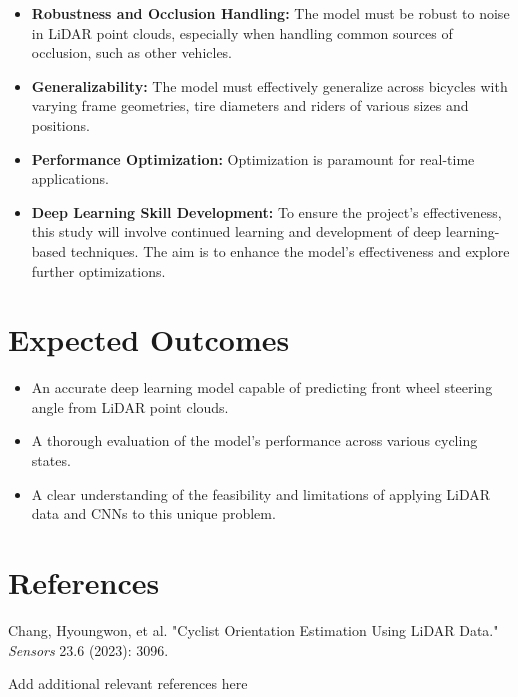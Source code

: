 \documentclass{article}
\begin{document}
\begin{itemize}
    \item \textbf{Robustness and Occlusion Handling:} The model must be robust to noise in LiDAR point clouds, especially when handling common sources of occlusion, such as other vehicles.
    \item \textbf{Generalizability:} The model must effectively generalize across bicycles with varying frame geometries, tire diameters and riders of various sizes and positions.
    \item \textbf{Performance Optimization:} Optimization is paramount for real-time applications.
    \item \textbf{Deep Learning Skill Development:} To ensure the project’s effectiveness, this study will involve continued learning and development of deep learning-based techniques. The aim is to enhance the model's effectiveness and explore further optimizations.
\end{itemize}

\section{Expected Outcomes}

\begin{itemize}
    \item An accurate deep learning model capable of predicting front wheel steering angle from LiDAR point clouds.
    \item A thorough evaluation of the model's performance across various cycling states.
    \item A clear understanding of the feasibility and limitations of applying LiDAR data and CNNs to this unique problem.
\end{itemize}

\section{References}

\begin{thebibliography}{9}
     Chang, Hyoungwon, et al. "Cyclist Orientation Estimation Using LiDAR Data." \textit{Sensors} 23.6 (2023): 3096.
    \item [Add additional relevant references here]
\end{thebibliography}
\end{document}
